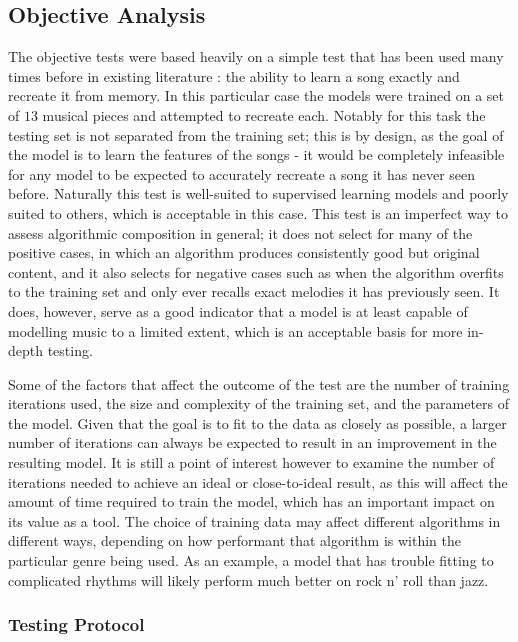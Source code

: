 \documentclass[ author={Stephen Livermore-Tozer},
				supervisor={Dr. Peter Flach},
				degree={MEng},
				title={Algorithmic Co-composition Using Machine Learning},
				subtitle={},
				type={research},
				year={2016} ]{dissertation}
\begin{document}
	\subsection{Objective Analysis}
	\label{sec:objective-analysis}
	
	The objective tests were based heavily on a simple test that has been used many times before in existing literature \cite{todd1989connectionist,franklin2006recurrent,paiement2007generative}: the ability to learn a song exactly and recreate it from memory. In this particular case the models were trained on a set of $13$ musical pieces and attempted to recreate each. Notably for this task the testing set is not separated from the training set; this is by design, as the goal of the model is to learn the features of the songs - it would be completely infeasible for any model to be expected to accurately recreate a song it has never seen before. Naturally this test is well-suited to supervised learning models and poorly suited to others, which is acceptable in this case. This test is an imperfect way to assess algorithmic composition in general; it does not select for many of the positive cases, in which an algorithm produces consistently good but original content, and it also selects for negative cases such as when the algorithm overfits to the training set and only ever recalls exact melodies it has previously seen. It does, however, serve as a good indicator that a model is at least capable of modelling music to a limited extent, which is an acceptable basis for more in-depth testing.
	
	Some of the factors that affect the outcome of the test are the number of training iterations used, the size and complexity of the training set, and the parameters of the model. Given that the goal is to fit to the data as closely as possible, a larger number of iterations can always be expected to result in an improvement in the resulting model. It is still a point of interest however to examine the number of iterations needed to achieve an ideal or close-to-ideal result, as this will affect the amount of time required to train the model, which has an important impact on its value as a tool. The choice of training data may affect different algorithms in different ways, depending on how performant that algorithm is within the particular genre being used. As an example, a model that has trouble fitting to complicated rhythms will likely perform much better on rock n' roll than jazz. 
	
	\subsubsection{Testing Protocol}
	
\end{document}
